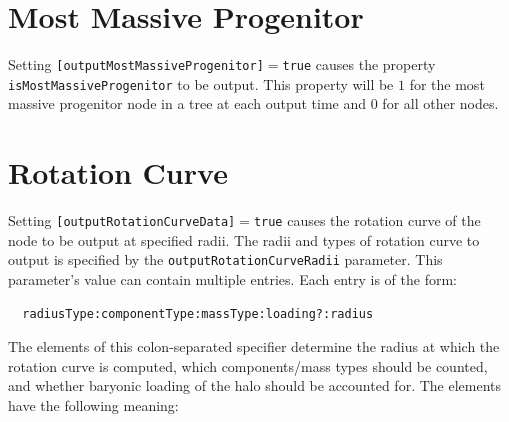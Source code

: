 \section{Most Massive Progenitor}

Setting {\tt [outputMostMassiveProgenitor]}$=${\tt true} causes the property {\tt isMostMassiveProgenitor} to be output. This property will be $1$ for the most massive progenitor node in a tree at each output time and $0$ for all other nodes.

\section{Rotation Curve}

Setting {\tt [outputRotationCurveData]}$=${\tt true} causes the rotation curve of the node to be output at specified radii. The radii and types of rotation curve to output is specified by the {\tt outputRotationCurveRadii} parameter. This parameter's value can contain multiple entries. Each entry is of the form:
\begin{verbatim}
  radiusType:componentType:massType:loading?:radius
\end{verbatim}
The elements of this colon-separated specifier determine the radius at which the rotation curve is computed, which components/mass types should be counted, and whether baryonic loading of the halo should be accounted for. The elements have the following meaning:

